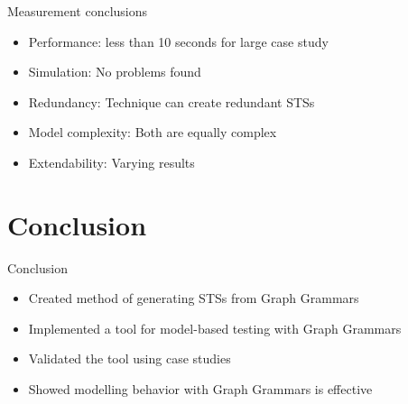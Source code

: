 \documentclass{FMTslides}
\begin{document}
\begin{frame}{Measurement conclusions}
  \begin{itemize}[<+->]
  \item Performance: less than 10 seconds for large case study
  \item Simulation: No problems found
  \item Redundancy: Technique can create redundant STSs
  \item Model complexity: Both are equally complex
  \item Extendability: Varying results
  \end{itemize}
\end{frame}

\section[Conclusion]{Conclusion}

\begin{frame}{Conclusion}
  \begin{itemize}[<+->]
    \item Created method of generating STSs from Graph Grammars
    \item Implemented a tool for model-based testing with Graph Grammars
    \item Validated the tool using case studies
    \item Showed modelling behavior with Graph Grammars is effective
  \end{itemize}
\end{frame}
\end{document}
